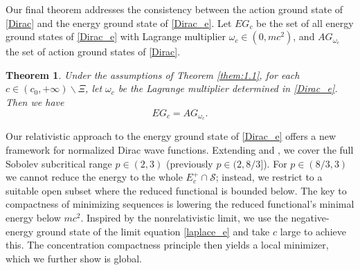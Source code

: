 \documentclass{amsart}
\theoremstyle{plain}
\newtheorem{theorem}{Theorem}[section]
\theoremstyle{definition}
\theoremstyle{remark}
\numberwithin{equation}{section} \numberwithin{figure}{section}
\begin{document}
Our final theorem addresses the consistency between the action ground state of \eqref{Dirac} and the energy ground state of \eqref{Dirac_e}. Let \(EG_c\) be the set of all energy ground states of \eqref{Dirac_e} with Lagrange multiplier \(\omega_c \in (0, mc^2)\), and \(AG_{\omega_c}\) the set of action ground states of \eqref{Dirac}.
  
\begin{theorem}\label{them:1.4}
  \normalfont
  Under the assumptions of Theorem \ref{them:1.1}, for each $c\in (c_0, + \infty)\backslash \Xi$, let $\omega_c$ be the Lagrange multiplier determined in \eqref{Dirac_e}. Then we have
  $$EG_c= AG_{\omega_c}.$$
\end{theorem}

Our relativistic approach to the energy ground state of \eqref{Dirac_e} offers a new framework for normalized Dirac wave functions. Extending \cite{CDGW24} and \cite{CN25}, we cover the full Sobolev subcritical range $p\in (2,3)$ (previously $p\in(2,8/3]$). For $p\in (8/3,3)$ we cannot reduce the energy to the whole \(E_c^+\cap\mathcal{S}\); instead, we restrict to a suitable open subset where the reduced functional is bounded below. The key to compactness of minimizing sequences is lowering the reduced functional’s minimal energy below \(mc^2\). Inspired by the nonrelativistic limit, we use the negative-energy ground state of the limit equation \eqref{laplace_e} and take $c$ large to achieve this. The concentration compactness principle then yields a local minimizer, which we further show is global.
\end{document}
